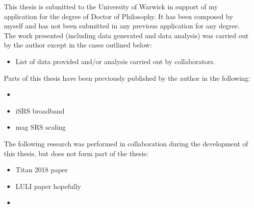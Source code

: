
\begin{thesisdeclaration}


This thesis is submitted to the University of Warwick in support of my application for the degree of Doctor of Philosophy. It has been composed by myself and has not been submitted in any previous application for any degree. \\


\noindent The work presented (including data generated and data analysis) was carried out by the author except in the cases outlined below:
\begin{singlespacing}
\begin{itemize}
    \item List of data provided and/or analysis carried out by collaborators.
\end{itemize}{}
\end{singlespacing}

\noindent Parts of this thesis have been previously published by the author in the following:
\begin{singlespacing}
\begin{itemize}
    \item {}
    \item iSRS broadband
    \item mag SRS scaling
\end{itemize}{}
\end{singlespacing}

\noindent The following research was performed in collaboration during the development of this thesis, but does not form part of the thesis:
\begin{singlespacing}
\begin{itemize}
    \item Titan 2018 paper
    \item LULI paper hopefully
    \item {}

\end{itemize}
\end{singlespacing}

\end{thesisdeclaration}
